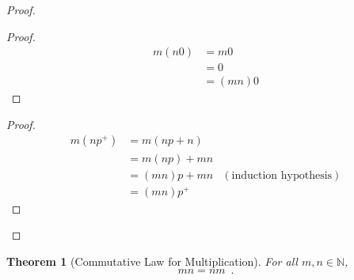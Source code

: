 \documentclass{book}
\let\qed\relax
\newtheorem{thm}[ax]{Theorem}
\theoremstyle{definition}
\begin{document}
\begin{proof}
\pf
{}
\begin{proof}
	\pf
	\begin{align*}
		m(n0) & = m0 \\
		& = 0 \\
		& = (mn)0
	\end{align*}
\end{proof}
\begin{proof}
	\pf
	\begin{align*}
		m(np^+) & = m(np + n) \\
		& = m(np) + mn \\
		& = (mn)p + mn & (\text{induction hypothesis}) \\
		& = (mn)p^+
	\end{align*}
\end{proof}
\qed
\end{proof}

\begin{thm}[Commutative Law for Multiplication]
For all $m,n \in \mathbb{N}$,
\[ mn = nm \enspace . \]
\end{thm}
\end{document}
